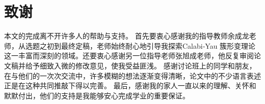 \chapter*{致谢}
本文的完成离不开许多人的帮助与支持。
首先要衷心感谢我的指导教师余成龙老师，从选题之初到最终定稿，老师始终耐心地引导我探索Calabi‑Yau 簇形变理论这一丰富而深刻的领域。还要衷心感谢另一位指导老师张旭成老师，他反复审阅论文稿并给予细致入微的修改意见，使我受益匪浅。
感谢讨论班上的同学和朋友，在与他们的一次次交流中，许多模糊的想法逐渐变得清晰，论文中的不少语言表述正是在这种共同推敲下得以完善。
最后，感谢我的家人一直以来的理解、关怀和默默付出，他们的支持是我能够安心完成学业的重要保证。
\cleardoublepage